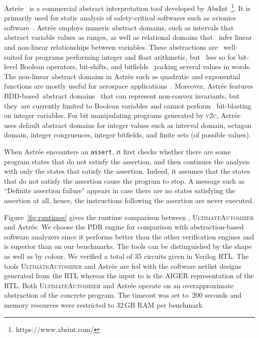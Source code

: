 Astr{\'e}e~\cite{DBLP:conf/esop/CousotCFMMMR05} is a commercial abstract 
interpretation tool developed by AbsInt~\footnote{https://www.absint.com/}.  
It is primarily used for static analysis of safety-critical softwares 
such as avionics software~\cite{DBLP:journals/corr/abs-cs-0701193}.
Astr{\'e}e employs numeric abstract domains, such as intervals that  
abstract variable values as ranges, as well as relational domains that  
infer linear and non-linear relationships between variables. These abstractions are  
well-suited for programs performing integer and float arithmetic, but  
less so for bit-level Boolean operators, bit-shifts, and bitfields  
packing several values in words.  The non-linear abstract domains in 
Astr{\'e}e such as quadratic and exponential functions are mostly useful 
for aerospace applications~\cite{DBLP:journals/ftpl/BertraneCCFMMR15}.  
Moreover, Astr{\'e}e features BDD-based abstract 
domains~\cite{bdd-domain} that can represent non-convex invariants, 
but they are currently limited to Boolean variables and cannot perform  
bit-blasting on integer variables.  For bit manipulating programs 
generated by \textsc{v2c}, Astr{\'e}e uses default abstract domains 
for integer values such as interval domain, octagon domain, integer 
congruences, integer bitfields, and finite sets (of possible values).


When Astr{\'e}e encounters an \texttt{assert}, it first checks whether 
there are some program states that do not satisfy the assertion, and 
then continues the analysis with only the states that satisfy the assertion. 
Indeed, it assumes that the states that do not satisfy the assertion cause 
the program to stop.  A message such as ``Definite assertion failure" appears 
in case there are no states satisfying the assertion at all, hence, the 
instructions following the assertion are never executed.


Figure~\ref{fig:runtimes} gives the runtime comparison between 
\ABC, \textsc{UltimateAutomizer} and Astr{\'e}e.  We choose 
the \ABC PDR engine for comparison with abstraction-based software 
analyzers since it performs better than the other verification engines 
and is superior than \ebmc on our benchmarks. The tools can be distinguished 
by the shape as well as by colour. 
%
We verified a total of 35 circuits given in Verilog RTL. 
The tools \textsc{UltimateAutomizer} and Astr{\'e}e are fed with the 
software netlist designs generated from the RTL whereas the input to 
\ABC is the AIGER representation of the RTL. 
% 
Both \textsc{UltimateAutomizer} and Astr{\'e}e operate 
on an overapproximate abstraction of the concrete program.  
The timeout was set to~200 seconds and memory resources 
were restricted to 32\,GB RAM per benchmark. 



